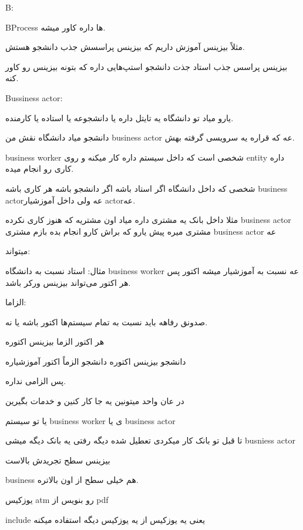 B:

BProcess ها داره کاور میشه.

مثلاً بیزینس آموزش داریم که بیزینس پراسسش جذب دانشجو هستش. 

بیزینس پراسس جذب استاد
جذت دانشجو
استپ‌هایی داره که بتونه بیزینس رو کاور کنه.

Bussiness actor: 

یارو میاد تو دانشگاه یه تایتل داره یا دانشجوعه یا استاده یا کارمنده.

دانشجو میاد دانشگاه نقش من business actor عه که قراره یه سرویسی گرفته بهش.

business worker شخصی است که داخل سیستم داره کار میکنه و روی entity داره کاری رو
انجام میده.

شخصی که داخل دانشگاه اگر استاد باشه اگر دانشجو باشه هر کاری باشه business actorعه 
ولی داخل آموزشیار actorعه.

مثلا داخل بانک یه مشتری داره میاد
اون مشتریه که هنوز کاری نکرده business actor
مشتری میره پیش یارو که براش کارو انجام بده بازم مشتری business actor عه




میتواند:

مثال: استاد نسبت به دانشگاه business worker عه نسبت به آموزشیار میشه اکتور
پس هر اکتور می‌تواند بیزینس ورکر باشد.

الزاما:

صدونق رفاهه باید نسبت به تمام سیستم‌ها اکتور باشه یا نه.

هر اکتور الزما بیزینس اکتوره

دانشجو بیزینس اکتوره
دانشجو الزماً اکتور آموزشیاره

پس الزامی نداره.

در عان واحد میتونین یه جا کار کنین و خدمات بگیرین

یا تو سیستم business worker ی یا business actor

تا قبل تو بانک کار میکردی
تعطیل شده دیگه رفتی یه بانک دیگه میشی busniess actor

بیزینس سطح تجریدش بالاست

business هم خیلی سطح از اون بالاتره.

یوزکیس atm رو بنویس از pdf

include یعنی یه یوزکیس از یه یوزکیس دیگه استفاده میکنه

